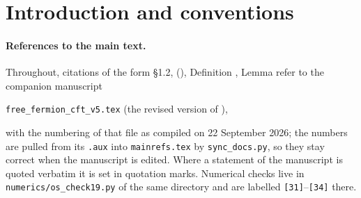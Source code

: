 \documentclass[11pt,a4paper]{article}
\theoremstyle{definition}
\newcommand{\1}{\mathds{1}}
\begin{document}
\section{Introduction and conventions}
\label{sec:intro}

\paragraph{References to the main text.}
Throughout, citations of the form \S1.2, (\mrLatVac), Definition \mrDefMomRG, Lemma \mrJackson{} refer to the companion
manuscript
\begin{center}
\texttt{free\_fermion\_cft\_v5.tex} \quad(the revised version of \cite{OsborneStottmeister}),
\end{center}
with the numbering of that file as compiled on 22 September 2026; the numbers are pulled from its \texttt{.aux} into \texttt{mainrefs.tex} by \texttt{sync\_docs.py}, so they stay correct when the manuscript is edited. Where a statement of the manuscript is
quoted verbatim it is set in quotation marks. Numerical checks live in
\texttt{numerics/os\_check19.py} of the same directory and are labelled \texttt{[31]}--\texttt{[34]}
there.
\end{document}
